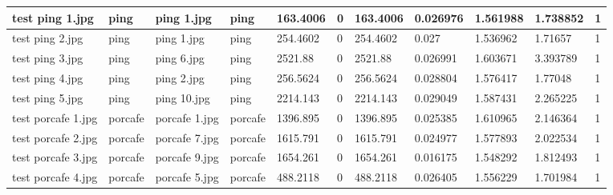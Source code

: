 \begin{landscape}
\begin{longtable}{|p{2cm}|p{1.5cm}|p{2cm}|p{1.5cm}|p{2cm}|p{1cm}|p{2cm}|p{2cm}|p{2cm}|p{2cm}|p{1cm}|}
		test ping 1.jpg      & ping             & ping 1.jpg            & ping                        & 163.4006              & 0                       & 163.4006                   & 0.026976              & 1.561988              & 1.738852                 & 1                \\ \hline
		test ping 2.jpg      & ping             & ping 1.jpg            & ping                        & 254.4602              & 0                       & 254.4602                   & 0.027                 & 1.536962              & 1.71657                  & 1                \\ \hline
		test ping 3.jpg      & ping             & ping 6.jpg            & ping                        & 2521.88               & 0                       & 2521.88                    & 0.026991              & 1.603671              & 3.393789                 & 1                \\ \hline
		test ping 4.jpg      & ping             & ping 2.jpg            & ping                        & 256.5624              & 0                       & 256.5624                   & 0.028804              & 1.576417              & 1.77048                  & 1                \\ \hline
		test ping 5.jpg      & ping             & ping 10.jpg           & ping                        & 2214.143              & 0                       & 2214.143                   & 0.029049              & 1.587431              & 2.265225                 & 1                \\ \hline
		test porcafe 1.jpg   & porcafe          & porcafe 1.jpg         & porcafe                     & 1396.895              & 0                       & 1396.895                   & 0.025385              & 1.610965              & 2.146364                 & 1                \\ \hline
		test porcafe 2.jpg   & porcafe          & porcafe 7.jpg         & porcafe                     & 1615.791              & 0                       & 1615.791                   & 0.024977              & 1.577893              & 2.022534                 & 1                \\ \hline
		test porcafe 3.jpg   & porcafe          & porcafe 9.jpg         & porcafe                     & 1654.261              & 0                       & 1654.261                   & 0.016175              & 1.548292              & 1.812493                 & 1                \\ \hline
		test porcafe 4.jpg   & porcafe          & porcafe 5.jpg         & porcafe                     & 488.2118              & 0                       & 488.2118                   & 0.026405              & 1.556229              & 1.701984                 & 1                \\ \hline

\end{longtable}
\end{landscape}
